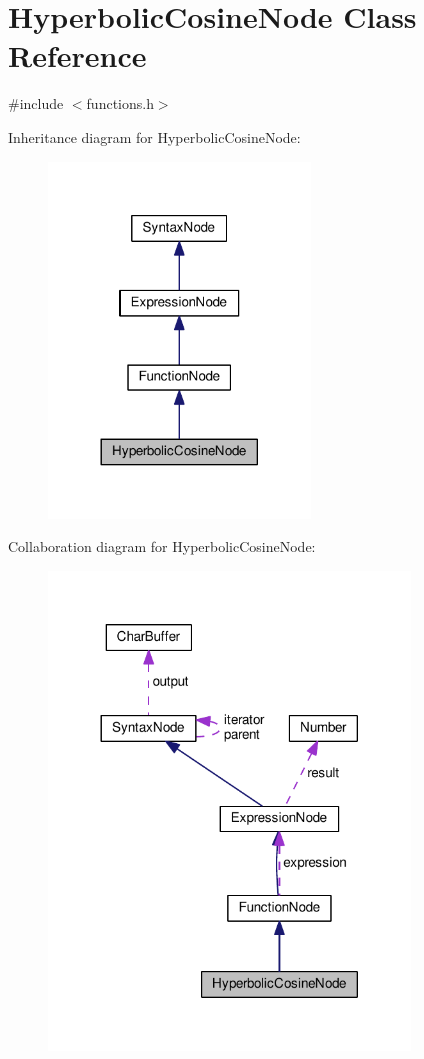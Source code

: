 \hypertarget{classHyperbolicCosineNode}{}\section{Hyperbolic\+Cosine\+Node Class Reference}
\label{classHyperbolicCosineNode}


{\ttfamily \#include $<$functions.\+h$>$}



Inheritance diagram for Hyperbolic\+Cosine\+Node\+:
\nopagebreak
\begin{figure}[H]
\begin{center}
\leavevmode
\includegraphics[width=197pt]{d2/de1/classHyperbolicCosineNode__inherit__graph}
\end{center}
\end{figure}


Collaboration diagram for Hyperbolic\+Cosine\+Node\+:
\nopagebreak
\begin{figure}[H]
\begin{center}
\leavevmode
\includegraphics[width=272pt]{d8/d62/classHyperbolicCosineNode__coll__graph}
\end{center}
\end{figure}
